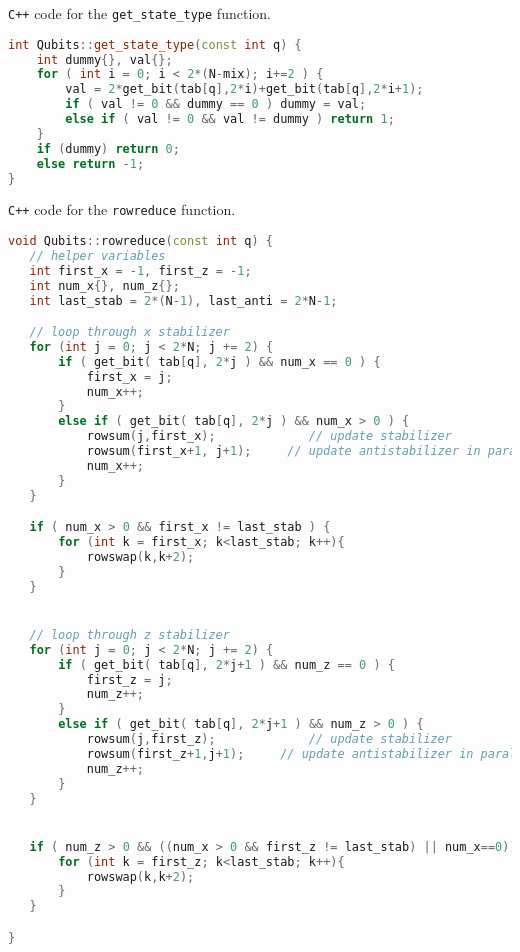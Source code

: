 \verb|C++| code for the \verb|get_state_type| function.
\begin{lstlisting}[caption=\texttt{get\_state\_type} function in the simulator,
label={lst:get-state-type-cpp}, language=C++]
int Qubits::get_state_type(const int q) {
    int dummy{}, val{};
    for ( int i = 0; i < 2*(N-mix); i+=2 ) {
        val = 2*get_bit(tab[q],2*i)+get_bit(tab[q],2*i+1);
        if ( val != 0 && dummy == 0 ) dummy = val;
        else if ( val != 0 && val != dummy ) return 1;
    }
    if (dummy) return 0;
    else return -1;
}
\end{lstlisting}
\verb|C++| code for the \verb|rowreduce| function.
\begin{lstlisting}[caption=\texttt{rowreduce} function in the simulator,
label={lst:rowreduce-cpp}, language=C++]
void Qubits::rowreduce(const int q) {
   // helper variables
   int first_x = -1, first_z = -1;
   int num_x{}, num_z{};
   int last_stab = 2*(N-1), last_anti = 2*N-1;

   // loop through x stabilizer
   for (int j = 0; j < 2*N; j += 2) {
       if ( get_bit( tab[q], 2*j ) && num_x == 0 ) {
           first_x = j;
           num_x++;
       }
       else if ( get_bit( tab[q], 2*j ) && num_x > 0 ) {
           rowsum(j,first_x);             // update stabilizer
           rowsum(first_x+1, j+1);     // update antistabilizer in parallel
           num_x++;
       } 
   }

   if ( num_x > 0 && first_x != last_stab ) {
       for (int k = first_x; k<last_stab; k++){
           rowswap(k,k+2);
       }
   }


   // loop through z stabilizer
   for (int j = 0; j < 2*N; j += 2) {
       if ( get_bit( tab[q], 2*j+1 ) && num_z == 0 ) {
           first_z = j;
           num_z++;
       }
       else if ( get_bit( tab[q], 2*j+1 ) && num_z > 0 ) {
           rowsum(j,first_z);             // update stabilizer
           rowsum(first_z+1,j+1);     // update antistabilizer in parallel
           num_z++;
       } 
   }


   if ( num_z > 0 && ((num_x > 0 && first_z != last_stab) || num_x==0)) {
       for (int k = first_z; k<last_stab; k++){
           rowswap(k,k+2);
       }
   }

}
\end{lstlisting}
